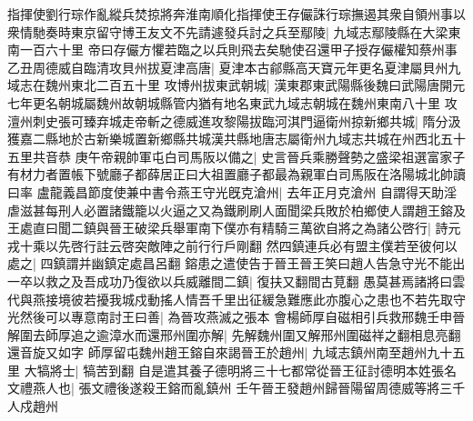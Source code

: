 指揮使劉行琮作亂縱兵焚掠將奔淮南順化指揮使王存儼誅行琮撫遏其衆自領州事以衆情馳奏時東京留守博王友文不先請遽發兵討之兵至鄢陵|{
	九域志鄢陵縣在大梁東南一百六十里}
帝曰存儼方懼若臨之以兵則飛去矣馳使召還甲子授存儼權知蔡州事　乙丑周德威自臨清攻貝州拔夏津高唐|{
	夏津本古鄃縣高天寶元年更名夏津屬貝州九域志在魏州東北二百五十里}
攻博州拔東武朝城|{
	漢東郡東武陽縣後魏曰武陽唐開元七年更名朝城屬魏州故朝城縣管内猶有地名東武九域志朝城在魏州東南八十里}
攻澶州刺史張可臻弃城走帝斬之德威進攻黎陽拔臨河淇門逼衛州掠新鄉共城|{
	隋分汲獲嘉二縣地於古新樂城置新鄉縣共城漢共縣地唐志屬衛州九域志共城在州西北五十五里共音恭}
庚午帝親帥軍屯白司馬阪以備之|{
	史言晉兵乘勝聲勢之盛梁祖選富家子有材力者置帳下號廳子都薛居正曰大祖置廳子都最為親軍白司馬阪在洛陽城北帥讀曰率}
盧龍義昌節度使兼中書令燕王守光旣克滄州|{
	去年正月克滄州}
自謂得天助淫虐滋甚每刑人必置諸鐵籠以火逼之又為鐵刷刷人面聞梁兵敗於柏鄉使人謂趙王鎔及王處直曰聞二鎮與晉王破梁兵舉軍南下僕亦有精騎三萬欲自將之為諸公啓行|{
	詩元戎十乘以先啓行註云啓突敵陣之前行行戶剛翻}
然四鎮連兵必有盟主僕若至彼何以處之|{
	四鎮謂并幽鎮定處昌呂翻}
鎔患之遣使告于晉王晉王笑曰趙人告急守光不能出一卒以救之及吾成功乃復欲以兵威離間二鎮|{
	復扶又翻間古莧翻}
愚莫甚焉諸將曰雲代與燕接境彼若擾我城戍動搖人情吾千里出征緩急難應此亦腹心之患也不若先取守光然後可以專意南討王曰善|{
	為晉攻燕滅之張本}
會楊師厚自磁相引兵救邢魏壬申晉解圍去師厚追之逾漳水而還邢州圍亦解|{
	先解魏州圍又解邢州圍磁祥之翻相息亮翻還音旋又如字}
師厚留屯魏州趙王鎔自來謁晉王於趙州|{
	九域志鎮州南至趙州九十五里}
大犒將士|{
	犒苦到翻}
自是遣其養子德明將三十七都常從晉王征討德明本姓張名文禮燕人也|{
	張文禮後遂殺王鎔而亂鎮州}
壬午晉王發趙州歸晉陽留周德威等將三千人戍趙州

